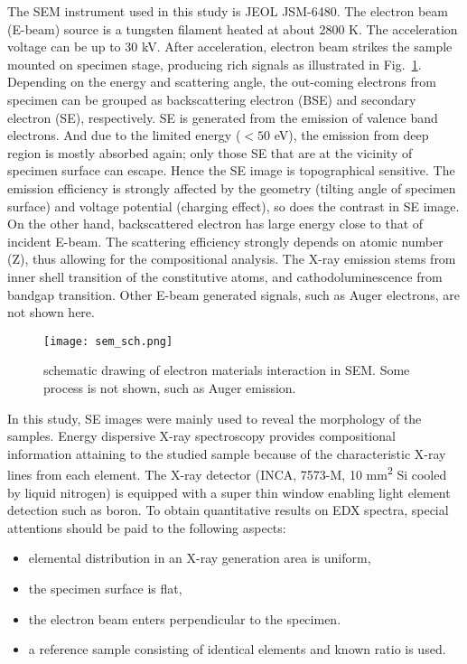 The SEM instrument used in this study is JEOL JSM-6480. The electron beam (E-beam) source is a tungsten filament heated at about 2800 K. The acceleration voltage can be up to 30 kV. After acceleration, electron beam strikes the sample mounted on specimen stage, producing rich signals as illustrated in Fig.~\ref{fig:ch2sem}. Depending on the energy and scattering angle, the out-coming electrons from specimen can be grouped as backscattering electron (BSE) and secondary electron (SE), respectively. SE is generated from the emission of valence band electrons. And due to the limited energy ($<50$ eV), the emission from deep region is mostly absorbed again; only those SE that are at the vicinity of specimen surface can escape. Hence the SE image is topographical sensitive. The emission efficiency is strongly affected by the geometry (tilting angle of specimen surface) and voltage potential (charging effect), so does the contrast in SE image. On the other hand, backscattered electron has large energy close to that of incident E-beam. The scattering efficiency strongly depends on atomic number (Z), thus allowing for the compositional analysis. The X-ray emission stems from inner shell transition of the constitutive atoms, and cathodoluminescence from bandgap transition. Other E-beam generated signals, such as Auger electrons, are not shown here.

\begin{figure}[htb]
\centering
\texttt{[image: sem\_sch.png]}
\caption[SEM excitation volume]{schematic drawing of electron materials interaction in SEM. Some process is not shown, such as Auger emission.}
\label{fig:ch2sem}
\end{figure}

In this study, SE images were mainly used to reveal the morphology of the samples. Energy dispersive X-ray spectroscopy provides compositional information attaining to the studied sample because of the characteristic X-ray lines from each element. The X-ray detector (INCA, 7573-M, 10 \si{mm^2} Si cooled by liquid nitrogen) is equipped with a super thin window enabling light element detection such as boron. To obtain quantitative results on EDX spectra, special attentions should be paid to the following aspects:
\begin{itemize}
\item elemental distribution in an X-ray generation area is uniform,
\item the specimen surface is flat,
\item the electron beam enters perpendicular to the specimen. 
\item a reference sample consisting of identical elements and known ratio is used. 
\end{itemize}

